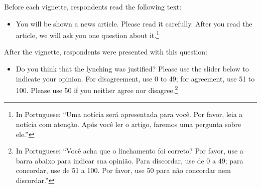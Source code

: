 \documentclass[12pt,a4paper]{article}
\providecommand{\tightlist}{%
   \setlength{\itemsep}{0pt}\setlength{\parskip}{0pt}}
\begin{document}
Before each vignette, respondents read the following text:

\begin{itemize}
\tightlist
\item
  You will be shown a news article. Please read it carefully. After you read the article, we will ask you one question about it.\footnote{In Portuguese: ``Uma notícia será apresentada para você. Por favor, leia a notícia com atenção. Após você ler o artigo, faremos uma pergunta sobre ele.''}
\end{itemize}

After the vignette, respondents were presented with this question:

\begin{itemize}
\tightlist
\item
  Do you think that the lynching was justified? Please use the slider below to indicate your opinion. For disagreement, use 0 to 49; for agreement, use 51 to 100. Please use 50 if you neither agree nor disagree.\footnote{In Portuguese: ``Você acha que o linchamento foi correto? Por favor, use a barra abaixo para indicar sua opinião. Para discordar, use de 0 a 49; para concordar, use de 51 a 100. Por favor, use 50 para não concordar nem discordar.''}
\end{itemize}
\end{document}

